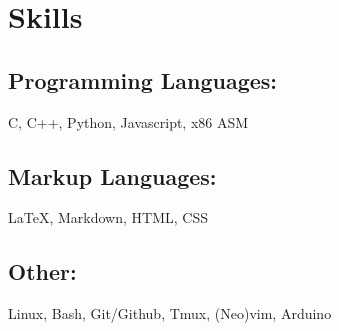 \documentclass{article}
\begin{document}
\section{Skills}
\subsection{Programming Languages:}
C, C++, Python, Javascript, x86 ASM
\subsection{Markup Languages:}
{\LaTeX}, Markdown, HTML, CSS
\subsection{Other:}
Linux, Bash, Git/Github, Tmux, (Neo)vim, Arduino
\end{document}
